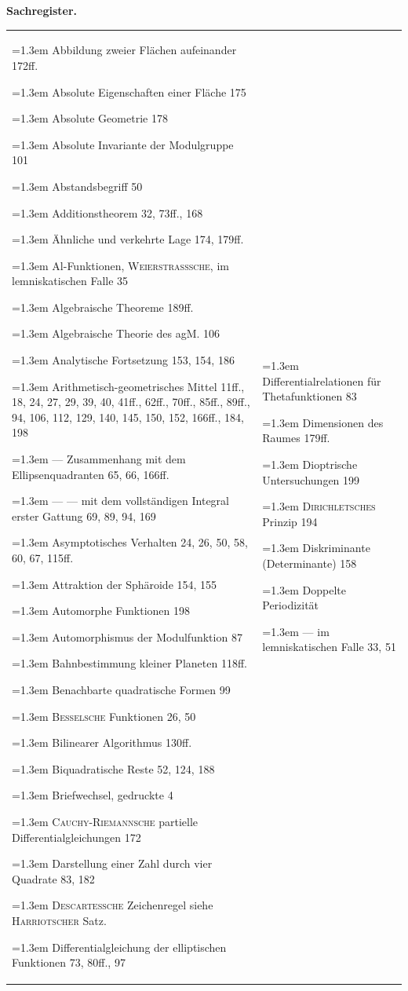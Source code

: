 \par\clearpage\NoSourceHead{}
\begin{center}\textbf{Sachregister.}\end{center}
\begingroup
\newcommand{\SI}[1]{\par\noindent\hangindent=1.3em\hangafter=1 #1\par}
\newcommand{\SG}{\par\vspace{.7\baselineskip}}
\setlength{\tabcolsep}{4pt}
\noindent\begin{tabular}{@{}p{.48\linewidth}|p{.48\linewidth}@{}}
\begin{minipage}[t]{\linewidth}\fontsize{8.2}{10.5}\selectfont\raggedright
\SI{Abbildung zweier Flächen aufeinander 172ff.}
\SI{Absolute Eigenschaften einer Fläche 175}
\SI{Absolute Geometrie 178}
\SI{Absolute Invariante der Modulgruppe 101}
\SI{Abstandsbegriff 50}
\SI{Additionstheorem 32, 73ff., 168}
\SI{Ähnliche und verkehrte Lage 174, 179ff.}
\SI{Al-Funktionen, \textsc{Weierstrasssche}, im lemniskatischen Falle 35}
\SI{Algebraische Theoreme 189ff.}
\SI{Algebraische Theorie des agM. 106}
\SI{Analytische Fortsetzung 153, 154, 186}
\SI{Arithmetisch-geometrisches Mittel 11ff., 18, 24, 27, 29, 39, 40, 41ff., 62ff., 70ff., 85ff., 89ff., 94, 106, 112, 129, 140, 145, 150, 152, 166ff., 184, 198}
\SI{— Zusammenhang mit dem Ellipsenquadranten 65, 66, 166ff.}
\SI{— — mit dem vollständigen Integral erster Gattung 69, 89, 94, 169}
\SI{Asymptotisches Verhalten 24, 26, 50, 58, 60, 67, 115ff.}
\SI{Attraktion der Sphäroide 154, 155}
\SI{Automorphe Funktionen 198}
\SI{Automorphismus der Modulfunktion 87}
\SG
\SI{Bahnbestimmung kleiner Planeten 118ff.}
\SI{Benachbarte quadratische Formen 99}
\SI{\textsc{Besselsche} Funktionen 26, 50}
\SI{Bilinearer Algorithmus 130ff.}
\SI{Biquadratische Reste 52, 124, 188}
\SI{Briefwechsel, gedruckte 4}
\SG
\SI{\textsc{Cauchy-Riemannsche} partielle Differentialgleichungen 172}
\SG
\SI{Darstellung einer Zahl durch vier Quadrate 83, 182}
\SI{\textsc{Descartessche} Zeichenregel siehe \textsc{Harriotscher} Satz.}
\SI{Differentialgleichung der elliptischen Funktionen 73, 80ff., 97}
\end{minipage}&
\begin{minipage}[t]{\linewidth}\fontsize{8.2}{10.5}\selectfont\raggedright
\SI{Differentialrelationen für Thetafunktionen 83}
\SI{Dimensionen des Raumes 179ff.}
\SI{Dioptrische Untersuchungen 199}
\SI{\textsc{Dirichletsches} Prinzip 194}
\SI{Diskriminante (Determinante) 158}
\SI{Doppelte Periodizität}
\SI{— im lemniskatischen Falle 33, 51}

\end{minipage}
\end{tabular}
